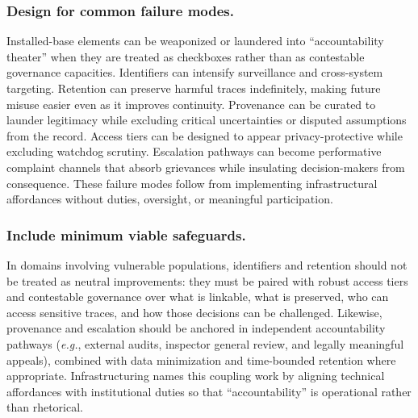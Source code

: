 \documentclass[acmsmall,screen]{acmart}
\begin{document}
\subsubsection*{Design for common failure modes.}
Installed-base elements can be weaponized or laundered into ``accountability theater'' when they are treated as checkboxes rather than as contestable governance capacities. Identifiers can intensify surveillance and cross-system targeting. Retention can preserve harmful traces indefinitely, making future misuse easier even as it improves continuity. Provenance can be curated to launder legitimacy while excluding critical uncertainties or disputed assumptions from the record. Access tiers can be designed to appear privacy-protective while excluding watchdog scrutiny. Escalation pathways can become performative complaint channels that absorb grievances while insulating decision-makers from consequence. These failure modes follow from implementing infrastructural affordances without duties, oversight, or meaningful participation.

\subsubsection*{Include minimum viable safeguards.}
In domains involving vulnerable populations, identifiers and retention should not be treated as neutral improvements: they must be paired with robust access tiers and contestable governance over what is linkable, what is preserved, who can access sensitive traces, and how those decisions can be challenged. Likewise, provenance and escalation should be anchored in independent accountability pathways (\textit{e.g.}, external audits, inspector general review, and legally meaningful appeals), combined with data minimization and time-bounded retention where appropriate. Infrastructuring names this coupling work by aligning technical affordances with institutional duties so that ``accountability'' is operational rather than rhetorical.
\end{document}

